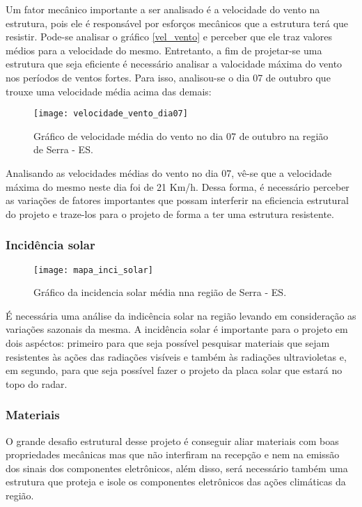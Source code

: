 Um fator mecânico importante a ser analisado é a velocidade do vento na estrutura, pois ele é responsável por esforços mecânicos que a estrutura terá que resistir. Pode-se analisar o gráfico \ref{vel_vento} e perceber que ele traz valores médios para a velocidade do mesmo. Entretanto, a fim de projetar-se uma estrutura que seja eficiente é necessário analisar a valocidade máxima do vento nos períodos de ventos fortes. Para isso, analisou-se o dia 07 de outubro que trouxe uma velocidade média acima das demais:

\begin{figure}[H]
	\texttt{[image: velocidade\_vento\_dia07]}
	\centering
	\caption{Gráfico de velocidade média do vento no dia 07 de outubro na região de Serra - ES.}
\end{figure}

Analisando as velocidades médias do vento no dia 07, vê-se que a velocidade máxima do mesmo neste dia foi de 21 Km/h. Dessa forma, é necessário perceber as variações de fatores importantes que possam interferir na eficiencia estrutural do projeto e traze-los para o projeto de forma a ter uma estrutura resistente.


\subsubsection{Incidência solar}


\begin{figure}[H]
	\texttt{[image: mapa\_inci\_solar]}
	\centering
	\caption{Gráfico da incidencia solar média nna região de Serra - ES.}
\end{figure}

É necessária uma análise da indicência solar na região levando em consideração as variações sazonais da mesma. A incidência solar é importante para o projeto em dois aspéctos: primeiro para que seja possível pesquisar materiais que sejam resistentes às ações das radiações  visíveis e também às radiações ultravioletas e, em segundo, para que seja possível fazer o projeto da placa solar que estará no topo do radar.

\subsubsection{Materiais}

O grande desafio estrutural desse projeto é conseguir aliar materiais com boas propriedades mecânicas mas que não interfiram na recepção e nem na emissão dos sinais dos componentes eletrônicos, além disso, será necessário também uma estrutura que proteja e isole os componentes eletrônicos das ações climáticas da região. 

